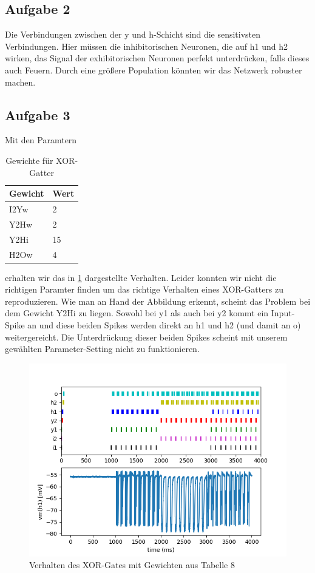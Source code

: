 \documentclass[10pt,a4paper]{scrartcl}
\begin{document}
\subsection{Aufgabe 2}
Die Verbindungen zwischen der y und h-Schicht sind die sensitivsten Verbindungen. Hier müssen die inhibitorischen Neuronen, die auf h1 und h2 wirken, das Signal der exhibitorischen Neuronen perfekt unterdrücken, falls dieses auch Feuern. Durch eine größere Population könnten wir das Netzwerk robuster machen.


\subsection{Aufgabe 3}
Mit den Paramtern

\begin{table}[H]
\centering
\captionsetup{justification=centering}
\caption{Gewichte für XOR-Gatter}
\begin{tabular}{l|l}
 Gewicht&Wert\\
\hline
I2Yw&2\\
Y2Hw&2\\
Y2Hi&15\\
H2Ow&4
\end{tabular}
\label{tab:08}
\end{table}

\noindent erhalten wir das in \ref{fig:abb42} dargestellte Verhalten. Leider konnten wir nicht die richtigen Paramter finden um das richtige Verhalten eines XOR-Gatters zu reproduzieren. Wie man an Hand der Abbildung erkennt, scheint das Problem bei dem Gewicht Y2Hi zu liegen. Sowohl bei y1 als auch bei y2 kommt ein Input-Spike an und diese beiden Spikes werden direkt an h1 und h2 (und damit an o) weitergereicht. Die Unterdrückung dieser beiden Spikes scheint mit unserem gewählten Parameter-Setting nicht zu funktionieren. 

\newpage

\begin{figure} [ht]
\begin{center}
\label{fig:abb42}
\caption{Verhalten des XOR-Gates mit Gewichten aus Tabelle 8}
\includegraphics[scale=0.45]{pictures/aufgabe7_3.png}
\end{center}
\end{figure}
\end{document}
